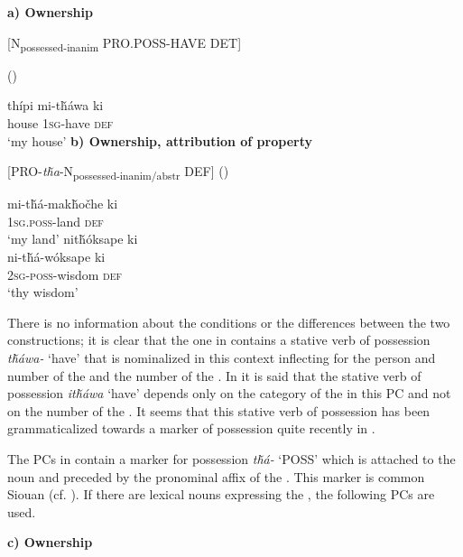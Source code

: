 \documentclass[output=paper]{LSP/langsci}
\begin{document}
\vspace{1em}
\textbf{a)	Ownership}

[N\textsubscript{possessed-inanim} PRO.POSS-HAVE DET]
\vspace{1em}

\ea {} (\citealt[98]{Buechel1939}) \label{lakotahouse}

\gll thípi     mi-t\v{h}áwa ki \\
house \textsc{1sg}-have  \textsc{def} \\
\glt `my house'
\z
\vspace{1em}
\textbf{b) Ownership, attribution of property}

[PRO-\textit{t\v{h}a}-N\textsubscript{possessed-inanim/abstr} DEF]
\vspace{1em}
\ea {} (\citealt[98]{Buechel1939}) \label{lakotalandwisdom}

\ea \gll mi-t\v{h}á-mak\v{h}o\v{c}he   ki \\
\textsc{1sg.poss}-land   \textsc{def} \\
\glt `my land'
\ex  
\glll nit\v{h}óksape ki \\
 ni-t\v{h}á-wóksape   ki \\
\textsc{2sg-poss}-wisdom  \textsc{def} \\
\glt `thy wisdom'
\z \z

There is no information about the conditions or the differences between the two constructions; it is clear that the one in  contains a stative verb of possession \textit{t\v{h}áwa-} `have' that is nominalized in this context inflecting for the person and number of the  and the number of the . In \citet[458]{RoodTaylor1996} it is said that the stative verb of possession \textit{it\v{h}áwa} `have' depends only on the category of the  in this PC and not on the number of the . It seems that this stative verb of possession has been grammaticalized towards a marker of possession quite recently in . 

The PCs in  contain a marker for possession \textit{t\v{h}á-} `POSS' which is attached to the  noun and preceded by the pronominal affix of the . This marker is common Siouan (cf. \citealt{RankinEtAl2015AccessMay}). If there are lexical nouns expressing the , the following PCs are used.

\vspace{1em}
\textbf{c)	Ownership}
\end{document}
